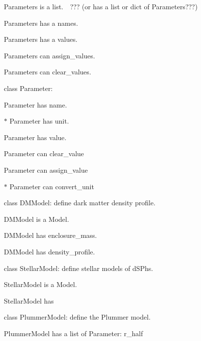 \begin{DoxyItemize}
\begin{DoxyItemize}
\item {\ttfamily Parameters} is a {\ttfamily list}.　??? (or has a {\ttfamily list} or {\ttfamily dict} of {\ttfamily Parameters}???)
\item {\ttfamily Parameters} has a {\ttfamily names}.
\item {\ttfamily Parameters} has a {\ttfamily values}.
\item {\ttfamily Parameters} can {\ttfamily assign\+\_\+values}.
\item {\ttfamily Parameters} can {\ttfamily clear\+\_\+values}.
\end{DoxyItemize}
\item class {\ttfamily Parameter}\+:
\begin{DoxyItemize}
\item {\ttfamily Parameter} has {\ttfamily name}.
\item $\ast$ {\ttfamily Parameter} has {\ttfamily unit}.
\item {\ttfamily Parameter} has {\ttfamily value}.
\item {\ttfamily Parameter} can {\ttfamily clear\+\_\+value}
\item {\ttfamily Parameter} can {\ttfamily assign\+\_\+value}
\item $\ast$ {\ttfamily Parameter} can {\ttfamily convert\+\_\+unit}
\end{DoxyItemize}
\item class {\ttfamily D\+M\+Model}\+: define dark matter density profile.
\begin{DoxyItemize}
\item {\ttfamily D\+M\+Model} is a {\ttfamily Model}.
\item {\ttfamily D\+M\+Model} has {\ttfamily enclosure\+\_\+mass}.
\item {\ttfamily D\+M\+Model} has {\ttfamily density\+\_\+profile}.
\end{DoxyItemize}
\item class {\ttfamily Stellar\+Model}\+: define stellar models of d\+S\+Phs.
\begin{DoxyItemize}
\item {\ttfamily Stellar\+Model} is a {\ttfamily Model}.
\item {\ttfamily Stellar\+Model} has
\end{DoxyItemize}
\item class {\ttfamily Plummer\+Model}\+: define the Plummer model.
\begin{DoxyItemize}
\item {\ttfamily Plummer\+Model} has a {\ttfamily list} of {\ttfamily Parameter}\+: {\ttfamily r\+\_\+half}

\end{DoxyItemize}
\end{DoxyItemize}
